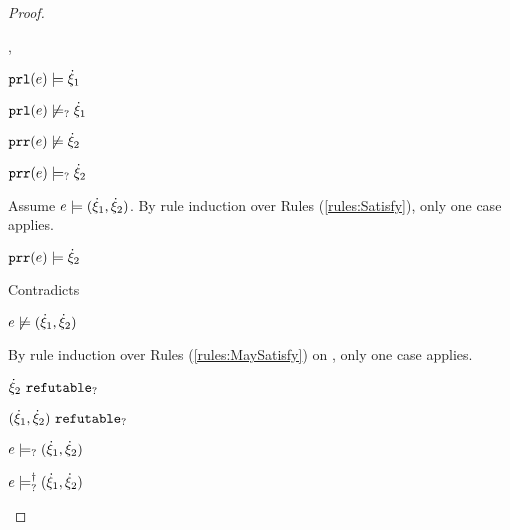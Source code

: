 \begin{proof}
\begin{byCases}
\begin{byCases}
\begin{byCases}
        \item[\csatisfy{\hprl{e}}{\hxi_1},\cmaysatisfy{\hprr{e}}{\hxi_2}]
            \begin{pfsteps*}
            \item $\mathtt{prl}(e) \models \dot{\xi}_1$  
            \item $\mathtt{prl}(e) \not\models_{?} \dot{\xi}_1$  
            \item $\mathtt{prr}(e) \not\models \dot{\xi}_2$  
            \item $\mathtt{prr}(e) \models_{?} \dot{\xi}_2$  
            \end{pfsteps*}
            Assume $e \models (\dot{\xi}_1 , \dot{\xi}_2)$. By rule induction over Rules (\ref{rules:Satisfy}), only one case applies.
            \begin{byCases}
            \item[\text{(\ref{rule:CSNotIntroPair})}]
                \begin{pfsteps*}
                \item $\mathtt{prr}(e) \models \dot{\xi}_2$ 
                \end{pfsteps*}
                Contradicts 
            \end{byCases}
            \begin{pfsteps*}
            \item $e \not\models (\dot{\xi}_1 , \dot{\xi}_2)$  
            \end{pfsteps*}
            By rule induction over Rules (\ref{rules:MaySatisfy}) on , only one case applies. 
            \begin{byCases}
            \item[\text{(\ref{rule:CMSNotIntro})}]
                \begin{pfsteps*}
                \item $\dot{\xi}_2 ~\mathtt{refutable}_?$  
                \item $(\dot{\xi}_1 , \dot{\xi}_2) ~\mathtt{refutable}_?$  
                \item $e \models_{?} (\dot{\xi}_1 , \dot{\xi}_2)$  
                \item $e \models_{?}^{\dag} (\dot{\xi}_1 , \dot{\xi}_2)$ 
                \end{pfsteps*}
            \end{byCases}
            

\end{byCases}
\end{byCases}
\end{byCases}
\end{proof}
